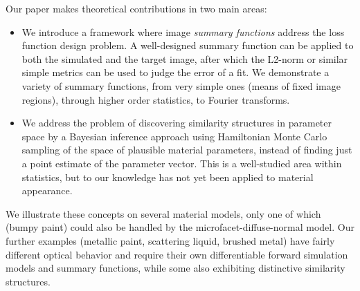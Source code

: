 Our paper makes theoretical contributions in two main areas:
\begin{itemize}
	\item We introduce a framework where image \emph{summary functions} address the loss function design problem. A well-designed summary function can be applied to both the simulated and the target image, after which the L2-norm or similar simple metrics can be used to judge the error of a fit. We demonstrate a variety of summary functions, from very simple ones (means of fixed image regions), through higher order statistics, to Fourier transforms. %
	\item We address the problem of discovering similarity structures in parameter space by a Bayesian inference approach using Hamiltonian Monte Carlo sampling of the space of plausible material parameters, instead of finding just a point estimate of the parameter vector. This is a well-studied area within statistics, but to our knowledge has not yet been applied to material appearance.
\end{itemize}

We illustrate these concepts on several material models, only one of which (bumpy paint) could also be handled by the microfacet-diffuse-normal model. Our further examples (metallic paint, scattering liquid, brushed metal) have fairly different optical behavior and require their own differentiable forward simulation models and summary functions, while some also exhibiting distinctive similarity structures.


